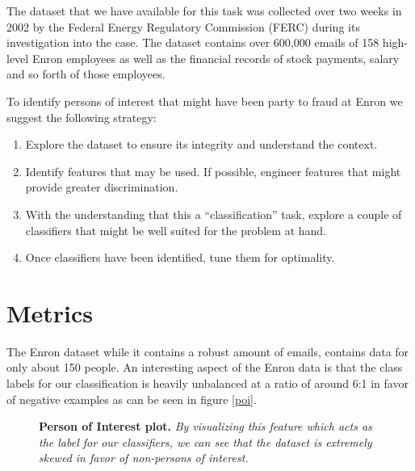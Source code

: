 \documentclass[twoside,openright,titlepage,numbers=noenddot,headinclude,%
               footinclude=true,cleardoublepage=empty,abstractoff,BCOR=5mm,%
               paper=a4,fontsize=11pt,ngerman,american]{scrreprt}
\numberwithin{theorem}{chapter}
\numberwithin{definition}{chapter}
\numberwithin{algorithm}{chapter}
\numberwithin{figure}{chapter}
\numberwithin{table}{chapter}
\numberwithin{equation}{chapter}
\begin{document}
The dataset that we have available for this task was collected over two weeks in 2002 by the Federal Energy Regulatory Commission (FERC) during its investigation into the case. The dataset contains over 600,000 emails of 158 high-level Enron employees as well as the financial records of stock payments, salary and so forth of those employees.

To identify persons of interest that might have been party to fraud at Enron we suggest the following strategy:
\begin{enumerate}%
\item Explore the dataset to ensure its integrity and understand the context.
\item Identify features that may be used. If possible, engineer features that might provide greater discrimination.
\item With the understanding that this a ``classification'' task, explore a couple of classifiers that might be well suited for the problem at hand.
\item Once classifiers have been identified, tune them for optimality.
\end{enumerate}



\section*{Metrics}

The Enron dataset while it contains a robust amount of emails, contains data for only about 150 people. An interesting aspect of the Enron data is that the class labels for our classification is heavily unbalanced at a ratio of around 6:1 in favor of negative examples as can be seen in figure \ref{poi}. 

\begin{figure}[!hbtp]
\centering
    
    \caption{\textbf{Person of Interest plot.}\textit{ By visualizing this feature which acts as the label for our classifiers, we can see that the dataset is extremely skewed in favor of non-persons of interest.}}
\end{figure}
\end{document}

